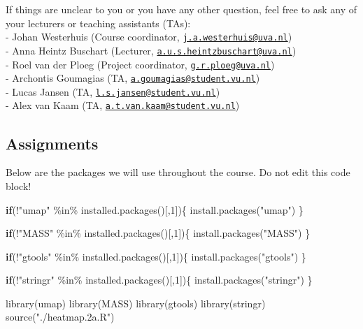 \documentclass[
]{article}
\newenvironment{Shaded}{\begin{snugshade}}{\end{snugshade}}
\newcommand{\ControlFlowTok}[1]{\textcolor[rgb]{0.13,0.29,0.53}{\textbf{#1}}}
\newcommand{\DecValTok}[1]{\textcolor[rgb]{0.00,0.00,0.81}{#1}}
\newcommand{\FunctionTok}[1]{\textcolor[rgb]{0.00,0.00,0.00}{#1}}
\newcommand{\NormalTok}[1]{#1}
\newcommand{\SpecialCharTok}[1]{\textcolor[rgb]{0.00,0.00,0.00}{#1}}
\newcommand{\StringTok}[1]{\textcolor[rgb]{0.31,0.60,0.02}{#1}}
\begin{document}
If things are unclear to you or you have any other question, feel free
to ask any of your lecturers or teaching assistants (TAs):\\
- Johan Westerhuis (Course coordinator,
\href{mailto:j.a.westerhuis@uva.nl}{\nolinkurl{j.a.westerhuis@uva.nl}})\\
- Anna Heintz Buschart (Lecturer,
\href{mailto:a.u.s.heintzbuschart@uva.nl}{\nolinkurl{a.u.s.heintzbuschart@uva.nl}})\\
- Roel van der Ploeg (Project coordinator,
\href{mailto:g.r.ploeg@uva.nl}{\nolinkurl{g.r.ploeg@uva.nl}})\\
- Archontis Goumagias (TA,
\href{mailto:a.goumagias@student.vu.nl}{\nolinkurl{a.goumagias@student.vu.nl}})\\
- Lucas Jansen (TA,
\href{mailto:l.s.jansen@student.vu.nl}{\nolinkurl{l.s.jansen@student.vu.nl}})\\
- Alex van Kaam (TA,
\href{mailto:a.t.van.kaam@student.vu.nl}{\nolinkurl{a.t.van.kaam@student.vu.nl}})\\

\hypertarget{assignments}{%
\subsection{Assignments}\label{assignments}}

Below are the packages we will use throughout the course. Do not edit
this code block!

\begin{Shaded}
\begin{Highlighting}[]
\ControlFlowTok{if}\NormalTok{(}\SpecialCharTok{!}\StringTok{"umap"} \SpecialCharTok{\%in\%} \FunctionTok{installed.packages}\NormalTok{()[,}\DecValTok{1}\NormalTok{])\{}
  \FunctionTok{install.packages}\NormalTok{(}\StringTok{"umap"}\NormalTok{)}
\NormalTok{\}}

\ControlFlowTok{if}\NormalTok{(}\SpecialCharTok{!}\StringTok{"MASS"} \SpecialCharTok{\%in\%} \FunctionTok{installed.packages}\NormalTok{()[,}\DecValTok{1}\NormalTok{])\{}
  \FunctionTok{install.packages}\NormalTok{(}\StringTok{"MASS"}\NormalTok{)}
\NormalTok{\}}

\ControlFlowTok{if}\NormalTok{(}\SpecialCharTok{!}\StringTok{"gtools"} \SpecialCharTok{\%in\%} \FunctionTok{installed.packages}\NormalTok{()[,}\DecValTok{1}\NormalTok{])\{}
  \FunctionTok{install.packages}\NormalTok{(}\StringTok{"gtools"}\NormalTok{)}
\NormalTok{\}}

\ControlFlowTok{if}\NormalTok{(}\SpecialCharTok{!}\StringTok{"stringr"} \SpecialCharTok{\%in\%} \FunctionTok{installed.packages}\NormalTok{()[,}\DecValTok{1}\NormalTok{])\{}
  \FunctionTok{install.packages}\NormalTok{(}\StringTok{"stringr"}\NormalTok{)}
\NormalTok{\}}

\FunctionTok{library}\NormalTok{(umap)}
\FunctionTok{library}\NormalTok{(MASS)}
\FunctionTok{library}\NormalTok{(gtools)}
\FunctionTok{library}\NormalTok{(stringr)}
\FunctionTok{source}\NormalTok{(}\StringTok{"./heatmap.2a.R"}\NormalTok{)}
\end{Highlighting}
\end{Shaded}
\end{document}
